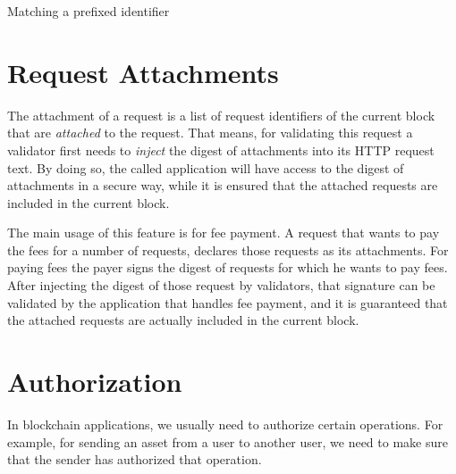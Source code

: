 \begin{algorithm}[h]
    \DontPrintSemicolon
    \BlankLine
    \BlankLine
    {
        {
            \;
        }
    }
    \;
    \caption{Matching a prefixed identifier}\label{alg:match_id}
\end{algorithm}

\section{Request Attachments}\label{sec:attachments}

The attachment of a request is a list of request identifiers of the current block that are \emph{attached} to the
request. That means, for validating this request a validator first needs to \emph{inject} the digest of attachments
into its HTTP request text. By doing so, the called application will have access to the digest of
attachments in a secure way, while it is ensured that the attached requests are included in the
current block.

The main usage of this feature is for fee payment. A request that wants to pay the fees for a number of requests,
declares those requests as its attachments. For paying fees the payer signs the digest of requests for which he
wants to pay fees. After injecting the digest of those request by validators, that signature can be validated by the
application that handles fee payment, and it is guaranteed that the attached requests are actually included in the
current block.


\section{Authorization}\label{sec:auth}

In blockchain applications, we usually need to authorize certain operations. For example, for sending an asset
from a user to another user, we need to make sure that the sender has authorized that operation.

